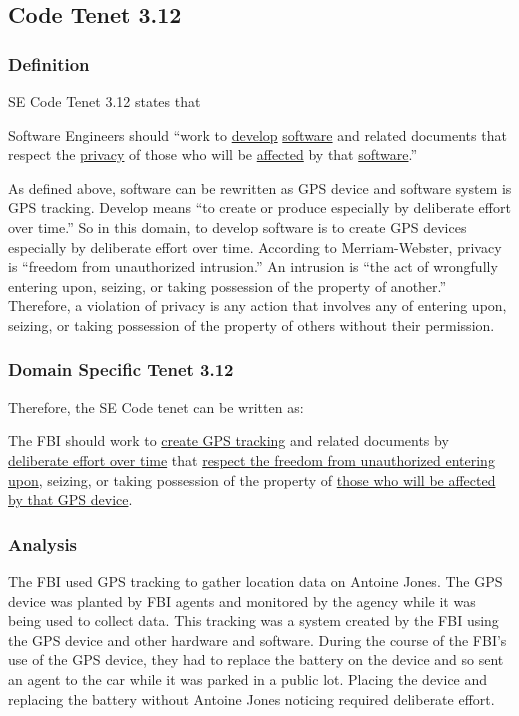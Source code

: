 \documentclass[12pt]{article}
\newcounter{subsubsubsection}[subsubsection]
\begin{document}
\begin{multicols}{2}
\subsection{Code Tenet 3.12}
\subsubsection{Definition}
SE Code Tenet 3.12 states that 
\begin{framed}
Software Engineers should ``work to \underline{develop} \underline{software} and related documents that respect the \underline{privacy} of those who will be \underline{affected} by that \underline{software}.''\cite{secode}
\end{framed}
As defined above, software can be rewritten as GPS device and software system is GPS tracking.
Develop means ``to create or produce especially by deliberate effort over time.''\cite{dictionary}
So in this domain, to develop software is to create GPS devices especially by deliberate effort over time.
According to Merriam-Webster, privacy is ``freedom from unauthorized intrusion.''\cite{dictionary}
An intrusion is ``the act of wrongfully entering upon, seizing, or taking possession of the property of another.''\cite{dictionary}
Therefore, a violation of privacy is any action that involves any of entering upon, seizing, or taking possession of the property of others without their permission.
\subsubsection{Domain Specific Tenet 3.12}
Therefore, the SE Code tenet can be written as: 
\begin{framed}
The FBI should work to \uline{create GPS tracking} and related documents by \uline{deliberate effort over time} that \uline{respect the freedom from unauthorized entering upon}, seizing, or taking possession of the property of \uline{those who will be affected by that GPS device}. 
\end{framed}
\subsubsection{Analysis}
The FBI used GPS tracking to gather location data on Antoine Jones. 
The GPS device was planted by FBI agents and monitored by the agency while it was being used to collect data. \cite{usvjonesopinions} 
This tracking was a system created by the FBI using the GPS device and other hardware and software. \cite{usvjonesopinions}
During the course of the FBI's use of the GPS device, they had to replace the battery on the device and so sent an agent to the car while it was parked in a public lot. \cite{usvjonesopinions}
Placing the device and replacing the battery without Antoine Jones noticing required deliberate effort.


\end{multicols}
\end{document}
